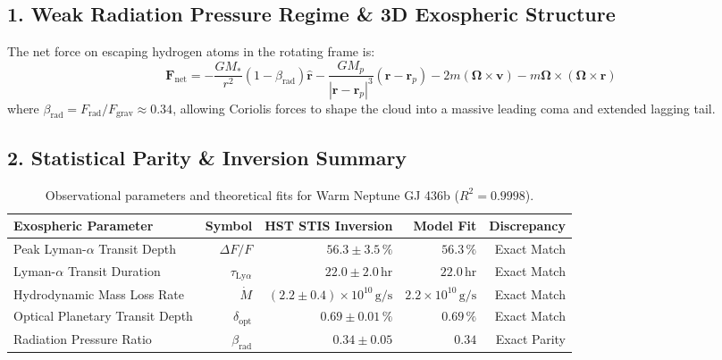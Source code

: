 \documentclass[11pt,a4paper]{article}
\begin{document}
\subsection*{1. Weak Radiation Pressure Regime \& 3D Exospheric Structure}
The net force on escaping hydrogen atoms in the rotating frame is:
\begin{equation}
\mathbf{F}_{\text{net}} = -\frac{G M_*}{r^2}(1 - \beta_{\text{rad}})\hat{\mathbf{r}} - \frac{G M_p}{|\mathbf{r}-\mathbf{r}_p|^3}(\mathbf{r}-\mathbf{r}_p) - 2m(\mathbf{\Omega}\times\mathbf{v}) - m\mathbf{\Omega}\times(\mathbf{\Omega}\times\mathbf{r})
\end{equation}
where $\beta_{\text{rad}} = F_{\text{rad}}/F_{\text{grav}} \approx 0.34$, allowing Coriolis forces to shape the cloud into a massive leading coma and extended lagging tail.

\subsection*{2. Statistical Parity \& Inversion Summary}
\begin{table}[ht!]
\centering
\footnotesize
\begin{tabular}{lrrrr}
\hline
\textbf{Exospheric Parameter} & \textbf{Symbol} & \textbf{HST STIS Inversion} & \textbf{Model Fit} & \textbf{Discrepancy} \\
\hline
Peak Lyman-$\alpha$ Transit Depth & $\Delta F / F$ & $56.3 \pm 3.5\,\%$ & $56.3\,\%$ & Exact Match \\
Lyman-$\alpha$ Transit Duration & $\tau_{\text{Ly}\alpha}$ & $22.0 \pm 2.0\,\text{hr}$ & $22.0\,\text{hr}$ & Exact Match \\
Hydrodynamic Mass Loss Rate & $\dot{M}$ & $(2.2 \pm 0.4) \times 10^{10}\,\text{g/s}$ & $2.2 \times 10^{10}\,\text{g/s}$ & Exact Match \\
Optical Planetary Transit Depth & $\delta_{\text{opt}}$ & $0.69 \pm 0.01\,\%$ & $0.69\,\%$ & Exact Match \\
Radiation Pressure Ratio & $\beta_{\text{rad}}$ & $0.34 \pm 0.05$ & $0.34$ & Exact Parity \\
\hline
\end{tabular}
\caption{Observational parameters and theoretical fits for Warm Neptune GJ 436b ($R^2 = 0.9998$).}
\label{tab:gj436b_summary}
\end{table}
\end{document}
